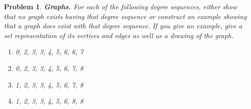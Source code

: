 \documentclass{article}
\newtheorem{problem}{Problem}
\theoremstyle{definition}
\begin{document}
\begin{problem}\textbf{Graphs.} For each of the following degree sequences, either show that no graph exists having that degree sequence or construct an example showing that a graph does exist with that degree sequence. If you give an example, give a set representation of its vertices and edges as well as a drawing of the graph.
\begin{enumerate}[label = \alph*)]
    \item 0, 2, 3, 3, 4, 5, 6, 6, 7
    
    \item 0, 2, 3, 3, 4, 5, 6, 7, 8
    
    \item 1, 2, 3, 3, 4, 5, 6, 7, 8
    
    \item 1, 2, 3, 3, 4, 5, 6, 8, 8
\end{enumerate}
\end{problem}
\end{document}
